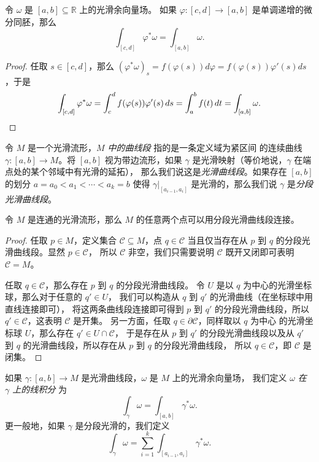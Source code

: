\begin{proposition}[积分的微分同胚不变性]\label{prop:diffeomorphic invariance of line integral}
  令 $\omega$ 是 $[a,b]\subseteq \mathbb{R}$ 上的光滑余向量场。
  如果 $\varphi:[c,d]\to[a,b]$ 是单调递增的微分同胚，那么
  \[
    \int_{[c,d]}\varphi^*\omega=\int_{[a,b]}\omega.  
  \]
\end{proposition}
\begin{proof}
  任取 $s\in [c,d]$，那么 
  $(\varphi^*\omega)_s=f(\varphi(s)) d\varphi=f(\varphi(s))\varphi'(s)ds$，于是
  \[
    \int_{[c,d]}\varphi^*\omega=\int_c^d f(\varphi(s))\varphi'(s)\, ds
    =\int_a^b f(t)\, dt=\int_{[a,b]}\omega.\qedhere
  \]
\end{proof}

令 $M$ 是一个光滑流形，\emph{$M$ 中的曲线段} 指的是一条定义域为紧区间
的连续曲线 $\gamma:[a,b]\to M$。将 $[a,b]$ 视为带边流形，如果
$\gamma$ 是光滑映射（等价地说，$\gamma$ 在端点处的某个邻域中有光滑的延拓），
那么我们说这是\emph{光滑曲线段}。如果存在 $[a,b]$ 的划分 $a=a_0<a_1<\cdots<a_k=b$
使得 $\gamma|_{[a_{i-1},a_i]}$ 是光滑的，那么我们说 $\gamma$
是\emph{分段光滑曲线段}。

\begin{proposition}
  令 $M$ 是连通的光滑流形，那么 $M$ 的任意两个点可以用分段光滑曲线段连接。
\end{proposition}
\begin{proof}
  任取 $p\in M$，定义集合 $\mathcal{C}\subseteq M$，点 $q\in \mathcal{C}$
  当且仅当存在从 $p$ 到 $q$ 的分段光滑曲线段。显然 $p\in \mathcal{C}$，
  所以 $\mathcal{C}$ 非空，我们只需要说明 $\mathcal{C}$ 既开又闭即可表明
  $\mathcal{C}=M$。

  任取 $q\in \mathcal{C}$，那么存在 $p$ 到 $q$ 的分段光滑曲线段。
  令 $U$ 是以 $q$ 为中心的光滑坐标球，那么对于任意的 $q'\in U$，
  我们可以构造从 $q$ 到 $q'$ 的光滑曲线（在坐标球中用直线连接即可），
  将这两条曲线段连接即可得到 $p$ 到 $q'$ 的分段光滑曲线段，所以
  $q'\in \mathcal{C}$，这表明 $\mathcal{C}$ 是开集。
  另一方面，任取 $q\in\partial \mathcal{C}$，同样取以 $q$ 为中心
  的光滑坐标球 $U$，那么存在 $q'\in U\cap \mathcal{C}$，
  于是存在从 $p$ 到 $q'$ 的分段光滑曲线段以及从 $q'$ 到 $q$
  的光滑曲线段，所以存在从 $p$ 到 $q$ 的分段光滑曲线段，
  所以 $q\in \mathcal{C}$，即 $\mathcal{C}$ 是闭集。
\end{proof}

如果 $\gamma:[a,b]\to M$ 是光滑曲线段，$\omega$ 是 $M$ 上的光滑余向量场，
我们定义 \emph{$\omega$ 在 $\gamma$ 上的线积分} 为
\[
  \int_\gamma\omega=\int_{[a,b]}\gamma^*\omega.  
\]
更一般地，如果 $\gamma$ 是分段光滑的，我们定义
\[
    \int_\gamma\omega=\sum_{i=1}^k\int_{[a_{i-1},a_i]}\gamma^*\omega.
\]

